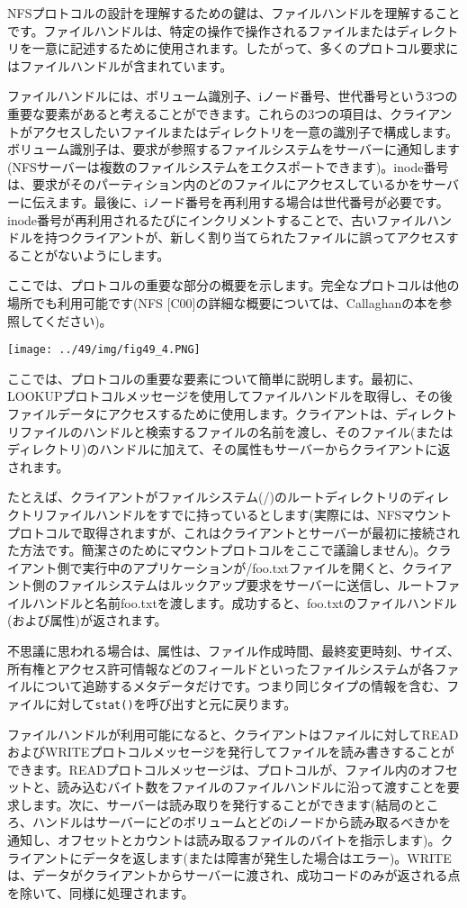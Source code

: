 NFSプロトコルの設計を理解するための鍵は、ファイルハンドルを理解することです。ファイルハンドルは、特定の操作で操作されるファイルまたはディレクトリを一意に記述するために使用されます。したがって、多くのプロトコル要求にはファイルハンドルが含まれています。

ファイルハンドルには、ボリューム識別子、iノード番号、世代番号という3つの重要な要素があると考えることができます。これらの3つの項目は、クライアントがアクセスしたいファイルまたはディレクトリを一意の識別子で構成します。ボリューム識別子は、要求が参照するファイルシステムをサーバーに通知します(NFSサーバーは複数のファイルシステムをエクスポートできます)。inode番号は、要求がそのパーティション内のどのファイルにアクセスしているかをサーバーに伝えます。最後に、iノード番号を再利用する場合は世代番号が必要です。inode番号が再利用されるたびにインクリメントすることで、古いファイルハンドルを持つクライアントが、新しく割り当てられたファイルに誤ってアクセスすることがないようにします。

ここでは、プロトコルの重要な部分の概要を示します。完全なプロトコルは他の場所でも利用可能です(NFS
{[}C00{]}の詳細な概要については、Callaghanの本を参照してください)。

\texttt{[image: ../49/img/fig49\_4.PNG]}

ここでは、プロトコルの重要な要素について簡単に説明します。最初に、LOOKUPプロトコルメッセージを使用してファイルハンドルを取得し、その後ファイルデータにアクセスするために使用します。クライアントは、ディレクトリファイルのハンドルと検索するファイルの名前を渡し、そのファイル(またはディレクトリ)のハンドルに加えて、その属性もサーバーからクライアントに返されます。

たとえば、クライアントがファイルシステム(/)のルートディレクトリのディレクトリファイルハンドルをすでに持っているとします(実際には、NFSマウントプロトコルで取得されますが、これはクライアントとサーバーが最初に接続された方法です。簡潔さのためにマウントプロトコルをここで議論しません)。クライアント側で実行中のアプリケーションが/foo.txtファイルを開くと、クライアント側のファイルシステムはルックアップ要求をサーバーに送信し、ルートファイルハンドルと名前foo.txtを渡します。成功すると、foo.txtのファイルハンドル(および属性)が返されます。

不思議に思われる場合は、属性は、ファイル作成時間、最終変更時刻、サイズ、所有権とアクセス許可情報などのフィールドといったファイルシステムが各ファイルについて追跡するメタデータだけです。つまり同じタイプの情報を含む、ファイルに対して\texttt{stat()}を呼び出すと元に戻ります。

ファイルハンドルが利用可能になると、クライアントはファイルに対してREADおよびWRITEプロトコルメッセージを発行してファイルを読み書きすることができます。READプロトコルメッセージは、プロトコルが、ファイル内のオフセットと、読み込むバイト数をファイルのファイルハンドルに沿って渡すことを要求します。次に、サーバーは読み取りを発行することができます(結局のところ、ハンドルはサーバーにどのボリュームとどのiノードから読み取るべきかを通知し、オフセットとカウントは読み取るファイルのバイトを指示します)。クライアントにデータを返します(または障害が発生した場合はエラー)。WRITEは、データがクライアントからサーバーに渡され、成功コードのみが返される点を除いて、同様に処理されます。

